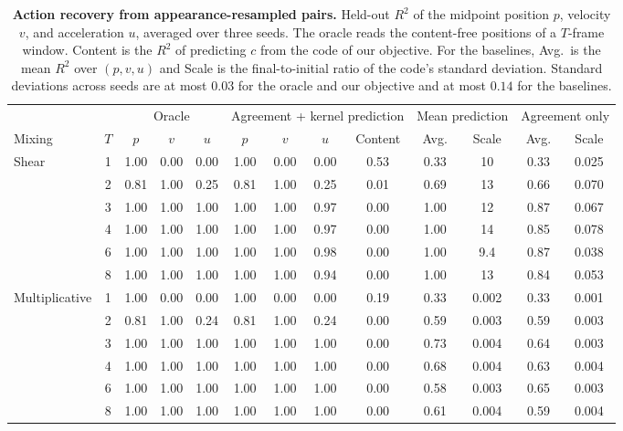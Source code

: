 \begin{table}[!htbp]
 \centering
 \caption{\textbf{Action recovery from appearance-resampled pairs.}
 Held-out $R^2$ of the midpoint position $p$, velocity $v$, and
 acceleration $u$, averaged over three seeds. The oracle reads the
 content-free positions of a $T$-frame window. Content is the $R^2$ of
 predicting $c$ from the code of our objective. For the baselines, Avg.\
 is the mean $R^2$ over $(p,v,u)$ and Scale is the final-to-initial ratio
 of the code's standard deviation. Standard deviations across seeds are
 at most $0.03$ for the oracle and our objective and at most $0.14$ for
 the baselines.}
 \label{tab:numerical-window}
 \small
 \setlength{\tabcolsep}{3.4pt}
 \begin{tabular}{@{}lcccccccccccc@{}}
 \toprule
 & & \multicolumn{3}{c}{Oracle}
 & \multicolumn{4}{c}{Agreement + kernel prediction}
 & \multicolumn{2}{c}{Mean prediction}
 & \multicolumn{2}{c}{Agreement only}\\
 \cmidrule(lr){3-5}\cmidrule(lr){6-9}\cmidrule(lr){10-11}\cmidrule(lr){12-13}
 Mixing & $T$ & $p$ & $v$ & $u$ & $p$ & $v$ & $u$ & Content
 & Avg. & Scale & Avg. & Scale\\
 \midrule
 Shear & 1 & 1.00 & 0.00 & 0.00 & 1.00 & 0.00 & 0.00 & 0.53 & 0.33 & 10 & 0.33 & 0.025\\
       & 2 & 0.81 & 1.00 & 0.25 & 0.81 & 1.00 & 0.25 & 0.01 & 0.69 & 13 & 0.66 & 0.070\\
       & 3 & 1.00 & 1.00 & 1.00 & 1.00 & 1.00 & 0.97 & 0.00 & 1.00 & 12 & 0.87 & 0.067\\
       & 4 & 1.00 & 1.00 & 1.00 & 1.00 & 1.00 & 0.97 & 0.00 & 1.00 & 14 & 0.85 & 0.078\\
       & 6 & 1.00 & 1.00 & 1.00 & 1.00 & 1.00 & 0.98 & 0.00 & 1.00 & 9.4 & 0.87 & 0.038\\
       & 8 & 1.00 & 1.00 & 1.00 & 1.00 & 1.00 & 0.94 & 0.00 & 1.00 & 13 & 0.84 & 0.053\\
 \midrule
 Multiplicative & 1 & 1.00 & 0.00 & 0.00 & 1.00 & 0.00 & 0.00 & 0.19 & 0.33 & 0.002 & 0.33 & 0.001\\
       & 2 & 0.81 & 1.00 & 0.24 & 0.81 & 1.00 & 0.24 & 0.00 & 0.59 & 0.003 & 0.59 & 0.003\\
       & 3 & 1.00 & 1.00 & 1.00 & 1.00 & 1.00 & 1.00 & 0.00 & 0.73 & 0.004 & 0.64 & 0.003\\
       & 4 & 1.00 & 1.00 & 1.00 & 1.00 & 1.00 & 1.00 & 0.00 & 0.68 & 0.004 & 0.63 & 0.004\\
       & 6 & 1.00 & 1.00 & 1.00 & 1.00 & 1.00 & 1.00 & 0.00 & 0.58 & 0.003 & 0.65 & 0.003\\
       & 8 & 1.00 & 1.00 & 1.00 & 1.00 & 1.00 & 1.00 & 0.00 & 0.61 & 0.004 & 0.59 & 0.004\\
 \bottomrule
 \end{tabular}
\end{table}

